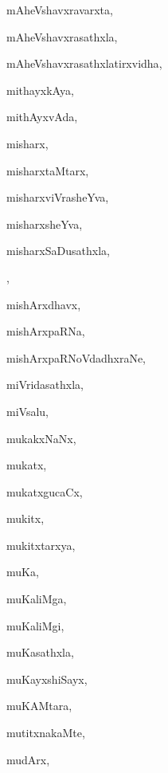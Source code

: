 \begin{multicols}{3}
{\noindent
{mAheVshavxravarxta}, \pageref{mAheVshavxravarxta}

\noindent
{mAheVshavxrasathxla}, \pageref{mAheVshavxrasathxla}

\noindent
{mAheVshavxrasathxlatirxvidha}, \pageref{mAheVshavxrasathxlatirxvidha}

\noindent
{mithayxkAya}, \pageref{mithayxkAya}

\noindent
{mithAyxvAda}, \pageref{mithAyxvAda}

\noindent
{misharx}, \pageref{misharx}

\noindent
{misharxtaMtarx}, \pageref{misharxtaMtarx}

\noindent
{misharxviVrasheYva}, \pageref{misharxviVrasheYva}

\noindent
{misharxsheYva}, \pageref{misharxsheYva}

\noindent
{misharxSaDusathxla,}

\noindent
{}, \pageref{misharxSaDusathxla, misharxliMgApaRNa}

\noindent
{mishArxdhavx}, \pageref{mishArxdhavx}

\noindent
{mishArxpaRNa}, \pageref{mishArxpaRNa}

\noindent
{mishArxpaRNoVdadhxraNe}, \pageref{mishArxpaRNoVdadhxraNe}

\noindent
{miVridasathxla}, \pageref{miVridasathxla}

\noindent
{miVsalu}, \pageref{miVsalu}

\noindent
{mukakxNaNx}, \pageref{mukakxNaNx}

\noindent
{mukatx}, \pageref{mukatx}

\noindent
{mukatxgucaCx}, \pageref{mukatxgucaCx}

\noindent
{mukitx}, \pageref{mukitx}

\noindent
{mukitxtarxya}, \pageref{mukitxtarxya}

\noindent
{muKa}, \pageref{muKa}

\noindent
{muKaliMga}, \pageref{muKaliMga}

\noindent
{muKaliMgi}, \pageref{muKaliMgi}

\noindent
{muKasathxla}, \pageref{muKasathxla}

\noindent
{muKayxshiSayx}, \pageref{muKayxshiSayx}

\noindent
{muKAMtara}, \pageref{muKAMtara}

\noindent
{mutitxnakaMte}, \pageref{mutitxnakaMte}

\noindent
{mudArx}, \pageref{mudArx}

}
\end{multicols}
